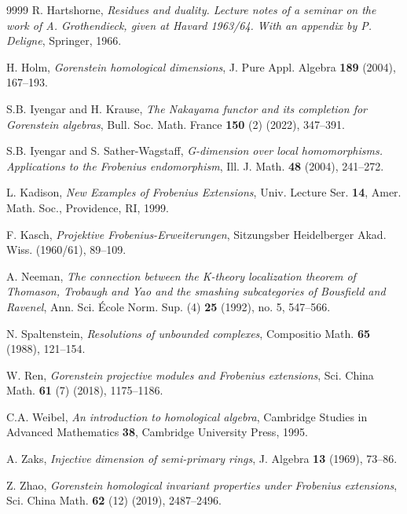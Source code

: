 \documentclass{amsart}
\newcommand{\0}{{\bf{0}}}
\theoremstyle{definition}
\begin{document}
\begin{thebibliography}{9999}
 R. Hartshorne, \emph{Residues and duality. Lecture notes of a seminar on the work of A. Grothendieck, given at Havard
1963/64. With an appendix by P. Deligne}, Springer, 1966.



  H. Holm, {\em  Gorenstein homological dimensions}, J. Pure Appl. Algebra {\bf 189} (2004), 167--193.


  S.B. Iyengar and H. Krause, {\em The Nakayama functor and its completion for Gorenstein algebras}, Bull. Soc. Math. France {\bf 150} (2) (2022), 347--391.


  S.B. Iyengar and S. Sather-Wagstaff, {\em G-dimension over local homomorphisms. Applications to the Frobenius endomorphism}, Ill. J. Math. {\bf  48} (2004), 241--272.


  L. Kadison, {\em New Examples of Frobenius Extensions}, Univ. Lecture Ser. {\bf 14}, Amer. Math. Soc., Providence, RI, 1999.

  F. Kasch, {\em Projektive Frobenius-Erweiterungen}, Sitzungsber Heidelberger Akad. Wiss. (1960/61), 89--109.

  A. Neeman, {\em The connection between the K-theory localization theorem of Thomason, Trobaugh and Yao and the smashing subcategories of Bousfield and Ravenel}, Ann. Sci. \'{E}cole Norm. Sup. (4) {\bf 25} (1992), no. 5, 547--566.





   N. Spaltenstein, {\em Resolutions of unbounded complexes}, Compositio Math. {\bf 65} (1988), 121--154.

  W. Ren, {\em Gorenstein projective modules and Frobenius extensions}, Sci. China Math. {\bf 61} (7) (2018), 1175--1186.

 C.A. Weibel, {\em An introduction to homological algebra}, Cambridge Studies in Advanced Mathematics {\bf 38}, Cambridge University Press, 1995.

  A. Zaks, {\em Injective dimension of semi-primary rings}, J. Algebra {\bf 13} (1969), 73--86.



  Z. Zhao, {\em Gorenstein homological invariant properties under Frobenius extensions}, Sci. China Math. {\bf 62} (12) (2019), 2487--2496.
\end{thebibliography}
\end{document}
